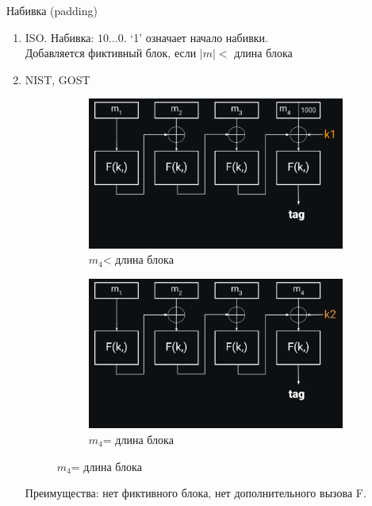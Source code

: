 \documentclass[usenames,dvipsnames,8pt,aspectratio=169]{beamer}
\begin{document}
\begin{frame}{Набивка (padding)}
	\Large
	\begin{enumerate}
		\itemsep1em
		\item {\color{Orange} ISO.} Набивка: $10\ldots0$. `1' означает начало набивки. \\
		Добавляется фиктивный блок, если $|m| < $ длина блока
		\item {\color{Orange} NIST, GOST}  
		\begin{figure}
			\captionsetup[subfigure]{labelformat=empty}
			\begin{subfigure}{.5\textwidth}
				\hspace{-30pt}
				\includegraphics[width=.95\textwidth]{CBC_Mac_Padding}
				\caption{\hspace{-30pt}  \Large $m_4$< длина блока}
			\end{subfigure}%
		 \begin{subfigure}{.5\textwidth}
		\hspace{-36pt}
			\includegraphics[width=.95\textwidth]{CBC_Mac_Padding_1}
			\caption{\hspace{-50pt}  \Large $m_4$= длина блока}
		\end{subfigure}%
		\end{figure}
		\vspace{1em}
		Преимущества: нет фиктивного блока, нет дополнительного вызова F.
		 
	\end{enumerate}
\end{frame}
\end{document}
